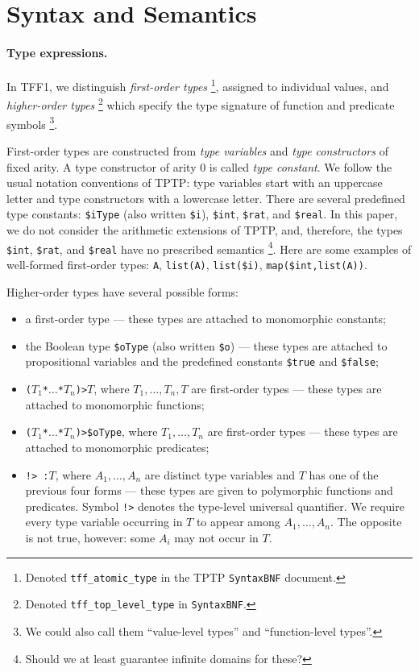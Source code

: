 \section{Syntax and Semantics} \label{sec_logic}

\paragraph{Type expressions.} In TFF1, we distinguish
{\em first-order types}%
\footnote{Denoted {\tt tff\_atomic\_type} in the
TPTP {\tt SyntaxBNF} document.}, assigned to individual values,
and {\em higher-order types}%
\footnote{Denoted {\tt tff\_top\_level\_type} in {\tt SyntaxBNF}.}
which specify the type signature of function and predicate symbols%
\footnote{We could also call them ``value-level types'' and
``function-level types''.}.

First-order types are constructed from {\em type variables\/}
and {\em type constructors\/} of fixed arity. A type constructor
of arity 0 is called {\em type constant}. We follow the usual
notation conventions of TPTP: type variables start with an
uppercase letter and type constructors with a lowercase letter.
There are several predefined type constants:
\verb+$iType+ (also written \verb+$i+),
\verb+$int+, \verb+$rat+, and \verb+$real+. In this paper,
we do not consider the arithmetic extensions of TPTP, and,
therefore, the types \verb+$int+, \verb+$rat+, and \verb+$real+
have no prescribed semantics%
\footnote{Should we at least guarantee infinite domains for these?}.
Here are some examples of well-formed first-order types:
\verb+A+, \verb+list(A)+, \verb+list($i)+, \verb+map($int,list(A))+.

Higher-order types have several possible forms:
\begin{itemize}
\item a first-order type --- these types are attached to
monomorphic constants;
\item the Boolean type \verb+$oType+ (also written \verb+$o+)
--- these types are attached to propositional variables and
the predefined constants \verb+$true+ and \verb+$false+;
\item {\tt ($T_1$\;*\;$\dots$\;*\;$T_n$)\;>\;$T$},
where $T_1,\dots,T_n,T$ are first-order types ---
these types are attached to monomorphic functions;
\item {\tt ($T_1$\;*\;$\dots$\;*\;$T_n$)\;>\;\$oType},
where $T_1,\dots,T_n$ are first-order types --- these types
are attached to monomorphic predicates;
\item {\tt !>\,:\;$T$}, where $A_1,\dots,A_n$ are distinct
type variables and $T$ has one of the previous four forms ---
these types are given to polymorphic functions and predicates.
Symbol {\tt !>} denotes the type-level universal quantifier.
We require every type variable occurring in $T$ to appear
among $A_1,\dots,A_n$. The opposite is not true, however:
some $A_i$ may not occur in $T$.
\end{itemize}

